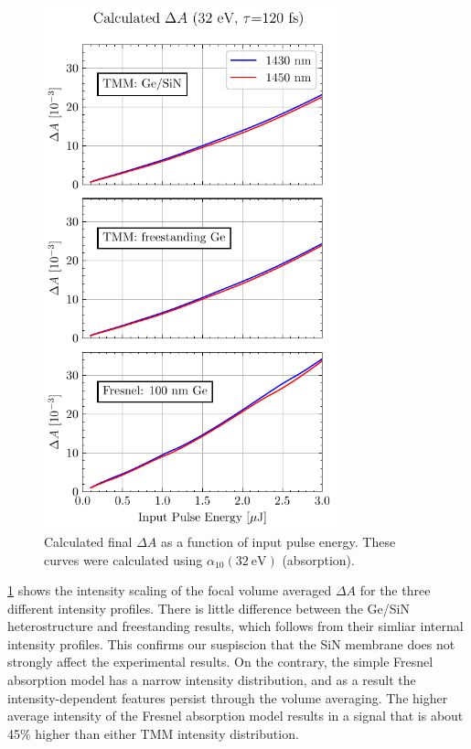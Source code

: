 \begin{figure}
	\centering
	\includegraphics[width=0.75\textwidth]{figures/chap4/FVA_XUV_signal.pdf}
	\caption{Calculated final $\Delta A$ as a function of input pulse energy. These curves were calculated using $\alpha_{10}(32 \ \textrm{eV})$ (absorption).}
	\label{fig:FVA_XUV_signal}
\end{figure}

\cref{fig:FVA_XUV_signal} shows the intensity scaling of the focal volume averaged $\Delta A$ for the three different intensity profiles. There is little difference between the Ge/SiN heterostructure and freestanding results, which follows from their simliar internal intensity profiles. This confirms our suspiscion that the SiN membrane does not strongly affect the experimental results. On the contrary, the simple Fresnel absorption model has a narrow intensity distribution, and as a result the intensity-dependent features persist through the volume averaging. The higher average intensity of the Fresnel absorption model results in a signal that is about 45\% higher than either TMM intensity distribution.

